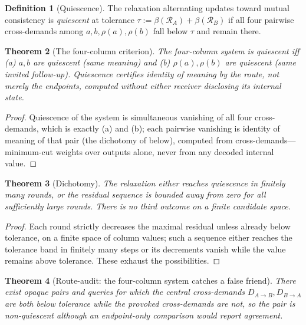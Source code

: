 \documentclass[11pt,twocolumn,a4paper]{article}
\theoremstyle{frathm}
\newtheorem{theorem}{Theorem}[section]
\theoremstyle{definition}
\newtheorem{definition}[theorem]{Definition}
\theoremstyle{remark}
\newcommand{\flo}{\beta}
\newcommand{\dem}{D}
\newcommand{\Rec}{\mathcal{R}}
\begin{document}
\begin{definition}[Quiescence]
\label{def:quiescence}
The relaxation alternating updates toward mutual consistency is
\emph{quiescent} at tolerance $\tau:=\flo(\Rec_A)+\flo(\Rec_B)$ if all
four pairwise cross-demands among $a,b,\rho(a),\rho(b)$ fall below $\tau$
and remain there.
\end{definition}

\begin{theorem}[The four-column criterion]
\label{thm:four}
The four-column system is quiescent iff \textup{(a)} $a,b$ are quiescent
(same meaning) and \textup{(b)} $\rho(a),\rho(b)$ are quiescent (same
invited follow-up). Quiescence certifies identity of meaning by the
\emph{route}, not merely the endpoints, computed without either receiver
disclosing its internal state.
\end{theorem}

\begin{proof}
Quiescence of the system is simultaneous vanishing of all four
cross-demands, which is exactly (a) and (b); each pairwise vanishing is
identity of meaning of that pair (the dichotomy of 
below), computed from cross-demands---minimum-cut weights over outputs
alone, never from any decoded internal value.
\end{proof}

\begin{theorem}[Dichotomy]
\label{thm:dichotomy}
The relaxation either reaches quiescence in finitely many rounds, or the
residual sequence is bounded away from zero for all sufficiently large
rounds. There is no third outcome on a finite candidate space.
\end{theorem}

\begin{proof}
Each round strictly decreases the maximal residual unless already below
tolerance, on a finite space of column values; such a sequence either
reaches the tolerance band in finitely many steps or its decrements
vanish while the value remains above tolerance. These exhaust the
possibilities.
\end{proof}

\begin{theorem}[Route-audit: the four-column system catches a false
friend]
\label{thm:false-friend}
There exist opaque pairs and queries for which the central cross-demands
$\dem_{A\to B},\dem_{B\to A}$ are both below tolerance while the provoked
cross-demands are not, so the pair is non-quiescent although an
endpoint-only comparison would report agreement.
\end{theorem}
\end{document}

